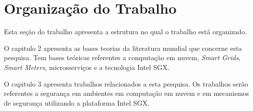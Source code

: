     




\section{Organização do Trabalho}
Esta seção do trabalho apresenta a estrutura no qual o trabalho está organizado.

O capitulo 2 apresenta as bases teorias da literatura mundial que concerne esta pesquisa. Tem bases teóricas referentes a computação em nuvem, \textit{Smart Grids}, \textit{Smart Meters}, microsserviços e a tecnologia Intel SGX. 

O capitulo 3 apresenta trabalhos relacionados a esta pesquisa. Os trabalhos serão referentes a segurança em ambientes em computação em nuvem e em mecanismos de segurança utilizando a plataforma Intel SGX.


